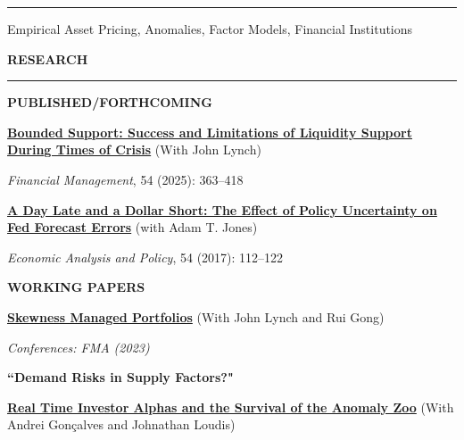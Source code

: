 \documentclass[11pt]{article}
\let\tempone\itemize
\let\temptwo\enditemize
\renewenvironment{itemize}{\tempone\addtolength{\itemsep}{-0.3\baselineskip}}{\temptwo}
\begin{document}
\rule[5pt]{470pt}{1pt}

Empirical Asset Pricing, Anomalies, Factor Models, Financial Institutions

\bigskip

\textbf{{\large R}{\footnotesize ESEARCH}}\vspace{-0.05in}

\rule[5pt]{470pt}{1pt}

\vspace{0.05in}

\textbf{P{\scriptsize UBLISHED}/F{\scriptsize ORTHCOMING}}

\vspace{.1in}

\textbf{\href{https://doi.org/10.1111/fima.12485}{Bounded Support: Success and Limitations of Liquidity Support During Times of Crisis}} (With John Lynch)

\textit{Financial Management}, 54 (2025): 363--418

\vspace{.15in}

\textbf{\href{https://doi.org/10.1016/j.eap.2017.03.004}{A Day Late and a Dollar Short: The Effect of Policy Uncertainty on Fed Forecast Errors}} (with Adam T. Jones)

\textit{Economic Analysis and Policy}, 54 (2017): 112--122

\vspace{.1in}


\textbf{W{\scriptsize ORKING} P{\scriptsize APERS}}

\vspace{.1in}

\textbf{\href{https://ssrn.com/abstract=6913978}{Skewness Managed Portfolios}} (With John Lynch and Rui Gong)

\textit{Conferences: FMA (2023)}

\vspace{.05in}

\vspace{.2in}

\textbf{``Demand Risks in Supply Factors?"
}
\vspace{.05in}

\vspace{.2in}

\textbf{\href{https://ssrn.com/abstract=5135221}{Real Time Investor Alphas and the Survival of the Anomaly Zoo}} (With Andrei Gonçalves and Johnathan Loudis)
\end{document}
